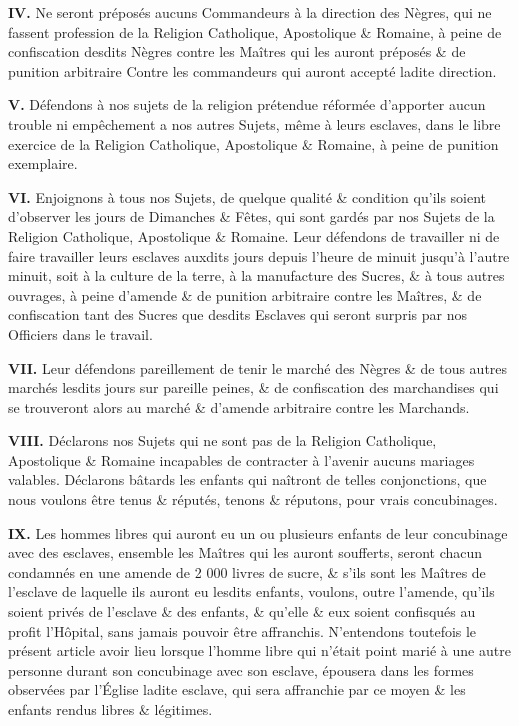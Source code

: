 \documentclass[french,twoside]{book} %
\newcommand{\labelchar}[1]{{\color{rubric}\bf #1}}
\begin{document}
\labelchar{IV.} Ne seront préposés aucuns Commandeurs à la direction des Nègres, qui ne fassent profession de la Religion Catholique, Apostolique \& Romaine, à peine de confiscation desdits Nègres contre les Maîtres qui les auront préposés \& de punition arbitraire Contre les commandeurs qui auront accepté ladite direction.\par
\labelchar{V.} Défendons à nos sujets de la religion prétendue réformée d’apporter aucun trouble ni empêchement a nos autres Sujets, même à leurs esclaves, dans le libre exercice de la Religion Catholique, Apostolique \& Romaine, à peine de punition exemplaire.\par
\labelchar{VI.} Enjoignons à tous nos Sujets, de quelque qualité \& condition qu’ils soient d’observer les jours de Dimanches \& Fêtes, qui sont gardés par nos Sujets de la Religion Catholique, Apostolique \& Romaine. Leur défendons de travailler ni de faire travailler leurs esclaves auxdits jours depuis l’heure de minuit jusqu’à l’autre minuit, soit à la culture de la terre, à la manufacture des Sucres, \& à tous autres ouvrages, à peine d’amende \& de punition arbitraire contre les Maîtres, \& de confiscation tant des Sucres que desdits Esclaves qui seront surpris par nos Officiers dans le travail.\par
\labelchar{VII.} Leur défendons pareillement de tenir le marché des Nègres \& de tous autres marchés lesdits jours sur pareille peines, \& de confiscation des marchandises qui se trouveront alors au marché \& d’amende arbitraire contre les Marchands.\par
\labelchar{VIII.} Déclarons nos Sujets qui ne sont pas de la Religion Catholique, Apostolique \& Romaine incapables de contracter à l’avenir aucuns mariages valables. Déclarons bâtards les enfants qui naîtront de telles conjonctions, que nous voulons être tenus \& réputés, tenons \& réputons, pour vrais concubinages.\par
\labelchar{IX.} Les hommes libres qui auront eu un ou plusieurs enfants de leur concubinage avec des esclaves, ensemble les Maîtres qui les auront soufferts, seront chacun condamnés en une amende de 2 000 livres de sucre, \& s’ils sont les Maîtres de l’esclave de laquelle ils auront eu lesdits enfants, voulons, outre l’amende, qu’ils soient privés de l’esclave \& des enfants, \& qu’elle \& eux soient confisqués au profit l’Hôpital, sans jamais pouvoir être affranchis. N’entendons toutefois le présent article avoir lieu lorsque l’homme libre qui n’était point marié à une autre personne durant son concubinage avec son esclave, épousera dans les formes observées par l’Église ladite esclave, qui sera affranchie par ce moyen \& les enfants rendus libres \& légitimes.\par
\end{document}
